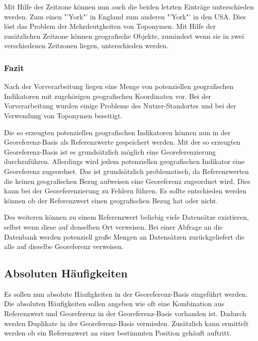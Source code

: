 				Mit Hilfe der Zeitzone können nun auch die beiden letzten Einträge unterschieden werden. 
				Zum einen "'York"' in England zum anderen "'York"' in den USA. 
				Dies löst das Problem der Mehrdeutgkeiten von Toponymen. 
				Mit Hilfe der zusätzlichen Zeitzone können geografische Objekte, zumindest wenn sie in zwei verschiedenen Zeitzonen liegen, unterschieden werden.

			\subsubsection{Fazit} 

				Nach der Vorverarbeitung liegen eine Menge von potenziellen geografischen Indikatoren mit zugehörigen geografischen Koordinaten vor.
				Bei der Vorverarbeitung wurden einige Probleme des Nutzer-Standortes und bei der Verwendung von Toponymen beseitigt.

				Die so erzeugten potenziellen geografischen Indikatoren können nun in der Georeferenz-Basis als Referenzwerte gespeichert werden.
				Mit der so erzeugten Georeferenz-Basis ist es grundsätzlich möglich eine Georeferenzierung durchzuführen. 
				Allerdings wird jedem potenziellen geografischen Indikator eine Georeferenz zugeordnet.
				Das ist grundsätzlich problematisch, da Referenzwerten die keinen geografischen Bezug aufweisen eine Georeferenz zugeordnet wird. 
				Dies kann bei der Georeferenzierung zu Fehlern führen.
				Es sollte entschieden werden können ob der Referenzwert einen geografischen Bezug hat oder nicht. 

				Des weiteren können zu einem Referenzwert beliebig viele Datensätze existieren, selbst wenn diese auf denselben Ort verweisen. 
				Bei einer Abfrage an die Datenbank werden potenziell große Mengen an Datensätzen zurückgeliefert die alle auf dieselbe Georeferenz verweisen.

		\subsection{Absoluten Häufigkeiten}

			Es sollen nun absolute Häufigkeiten in der Georeferenz-Basis eingeführt werden.
			Die absoluten Häufigkeiten sollen angeben wie oft eine Kombination aus Referenzwert und Georeferenz in der Georeferenz-Basis vorhanden ist.
			Dadurch werden Duplikate in der Georeferenz-Basis vermieden.
			Zusätzlich kann ermittelt werden ob ein Referenzwert an einer bestimmten Position gehäuft auftritt.

